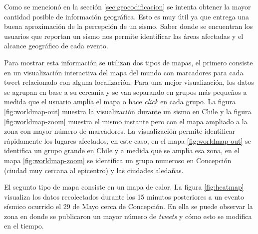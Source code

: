 	  	
	Como se mencionó en la sección \ref{sec:geocodificacion} se intenta obtener la mayor cantidad posible de información geográfica. 
	Esto es muy útil ya que entrega una buena aproximación de la percepción de un sismo. 
	Saber donde se encuentran los usuarios que reportan un sismo nos permite identificar las áreas afectadas y el alcance geográfico de cada evento. 
	
	
	Para mostrar esta información se utilizan dos tipos de mapas, el primero consiste en un visualización interactiva del mapa del mundo con marcadores para cada tweet relacionado con alguna localización.
	Para una mejor visualización, los datos se agrupan en base a su cercanía y se van separando en grupos más pequeños a medida que el usuario amplía el mapa o hace \textit{click} en cada grupo. 
	La figura \ref{fig:worldmap-out} muestra la visualización durante un sismo en Chile y la figura \ref{fig:worldmap-zoom} muestra el mismo instante pero con el mapa ampliado a la zona con mayor número de marcadores.
	La visualización permite identificar rápidamente los lugares afectados, en este caso, en el mapa \ref{fig:worldmap-out} se identifica un grupo grande en Chile y a medida que se amplía esa zona, en el mapa \ref{fig:worldmap-zoom} se identifica un grupo numeroso en Concepción (ciudad muy cercana al epicentro) y las ciudades aledañas.
	
	El segunto tipo de mapa consiste en un mapa de calor. 
	La figura \ref{fig:heatmap} visualiza los datos recolectados durante los 15 minutos posteriores a un evento sísmico ocurrido el 29 de Mayo cerca de Concepción. 
	En ella se puede observar la zona en donde se publicaron un mayor número de \textit{tweets} y cómo esto se modifica en el tiempo.
	
